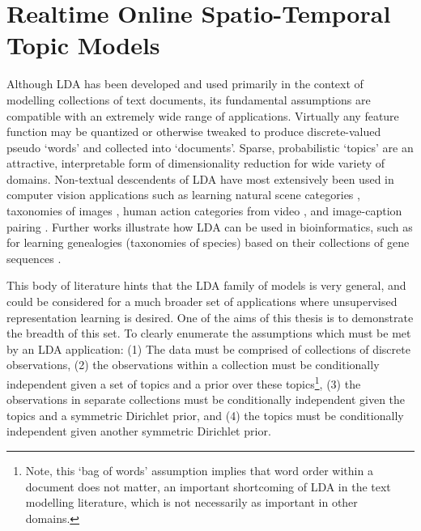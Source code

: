 \section{Realtime Online Spatio-Temporal Topic Models}
Although LDA has been developed and used primarily in the context of modelling collections of text documents, its fundamental assumptions are compatible with an extremely wide range of applications. Virtually any feature function may be quantized or otherwise tweaked to produce discrete-valued pseudo `words' and collected into `documents'. Sparse, probabilistic `topics' are an attractive, interpretable form of dimensionality reduction for wide variety of domains. Non-textual descendents of LDA have most extensively been used in computer vision applications such as learning natural scene categories \citep{FeiFei2005}, taxonomies of images \citep{bart2011}, human action categories from video \citep{Niebles2008}, and image-caption pairing \citep{Blei2003Captions}. Further works illustrate how LDA can be used in bioinformatics, such as for learning genealogies (taxonomies of species) based on their collections of gene sequences \citep{Pritchard2000}. 

This body of literature hints that the LDA family of models is very general, and could be considered for a much broader set of applications where unsupervised representation learning is desired. One of the aims of this thesis is to demonstrate the breadth of this set. To clearly enumerate the assumptions which must be met by an LDA application: (1) The data must be comprised of collections of discrete observations, (2) the observations within a collection must be conditionally independent given a set of topics and a prior over these topics\footnote{Note, this `bag of words' assumption implies that word order within a document does not matter, an important shortcoming of LDA in the text modelling literature, which is not necessarily as important in other domains.}, (3) the observations in separate collections must be conditionally independent given the topics and a symmetric Dirichlet prior, and (4) the topics must be conditionally independent given another symmetric Dirichlet prior.

